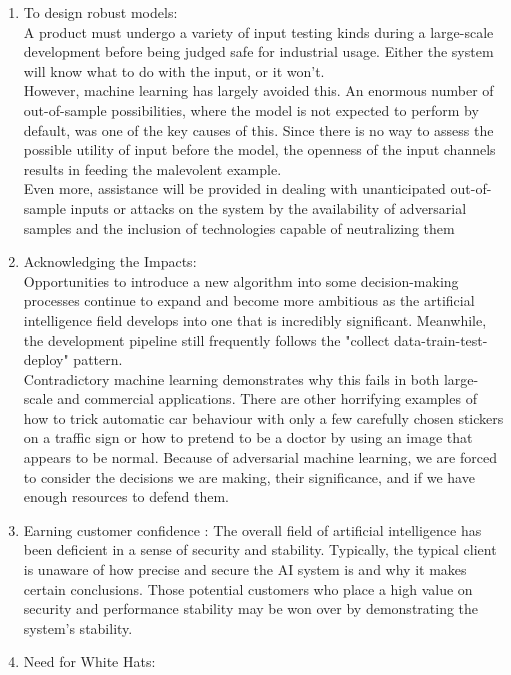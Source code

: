 \documentclass[ 12pt,a4paper,twocolumn,fleqn]{article}
\begin{document}
\begin{enumerate}
    \item To design robust models: \\
    A product must undergo a variety of input testing kinds during a large-scale development before being judged safe for industrial usage. Either the system will know what to do with the input, or it won't.\\
    However, machine learning has largely avoided this. An enormous number of out-of-sample possibilities, where the model is not expected to perform by default, was one of the key causes of this. Since there is no way to assess the possible utility of input before the model, the openness of the input channels results in feeding the malevolent example.\\
    Even more, assistance will be provided in dealing with unanticipated out-of-sample inputs or attacks on the system by the availability of adversarial samples and the inclusion of technologies capable of neutralizing them
    \item  Acknowledging the Impacts:\\
    Opportunities to introduce a new algorithm into some decision-making processes continue to expand and become more ambitious as the artificial intelligence field develops into one that is incredibly significant. Meanwhile, the development pipeline still frequently follows the "collect data-train-test-deploy" pattern.\\
    Contradictory machine learning demonstrates why this fails in both large-scale and commercial applications. There are other horrifying examples of how to trick automatic car behaviour with only a few carefully chosen stickers on a traffic sign or how to pretend to be a doctor by using an image that appears to be normal. Because of adversarial machine learning, we are forced to consider the decisions we are making, their significance, and if we have enough resources to defend them.
    \item Earning customer confidence :
    The overall field of artificial intelligence has been deficient in a sense of security and stability. Typically, the typical client is unaware of how precise and secure the AI system is and why it makes certain conclusions. Those potential customers who place a high value on security and performance stability may be won over by demonstrating the system's stability.
    \item Need for White Hats: \\

\end{enumerate}
\end{document}
